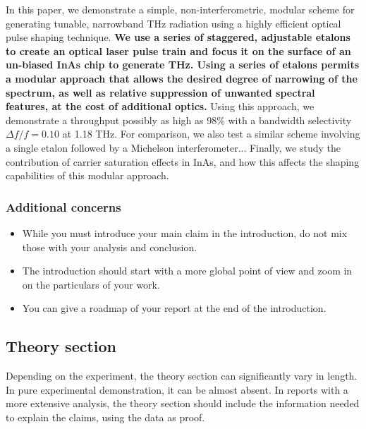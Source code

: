 \documentclass[12pt]{article}
\begin{document}
\begin{em}
  \textcolor{BurntOrange}{In this paper, we demonstrate a simple,
    non-interferometric, modular scheme for generating tunable,
    narrowband THz radiation using a highly efficient optical pulse
    shaping technique.} \textbf{We use a series of staggered,
    adjustable etalons to create an optical laser pulse train and
    focus it on the surface of an un-biased InAs chip to generate
    THz. Using a series of etalons permits a modular approach that
    allows the desired degree of narrowing of the spectrum, as well as
    relative suppression of unwanted spectral features, at the cost of
    additional optics.} \textcolor{Sepia}{Using this approach, we
    demonstrate a throughput possibly as high as 98\% with a bandwidth
    selectivity $\Delta f / f = 0.10$ at 1.18 THz.}
  \textcolor{BurntOrange}{For comparison, we also test a similar
    scheme involving a single etalon followed by a Michelson
    interferometer... Finally, we study the contribution of carrier
    saturation effects in InAs, and how this affects the shaping
    capabilities of this modular approach.}
\end{em}

\subsubsection{Additional concerns}

\begin{itemize}
\item While you must introduce your main claim in the introduction, do
  not mix those with your analysis and conclusion.
\item The introduction should start with a more global point of view
  and zoom in on the particulars of your work.
\item You can give a roadmap of your report at the end of the
  introduction.
\end{itemize}

\newpage

\subsection{Theory section}
\label{sec:Theory}

 Depending on the experiment, the theory section can significantly vary in
 length. In pure experimental demonstration, it can be almost absent. In
 reports with a more extensive analysis, the theory section should include
 the information needed to explain the claims, using the data as proof.
\end{document}
